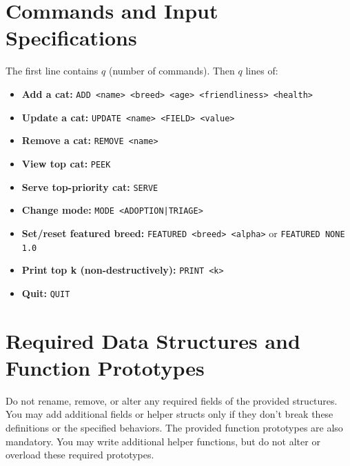 \documentclass[11pt]{article}
\begin{document}
\section*{Commands and Input Specifications}
The first line contains $q$ (number of commands). Then $q$ lines of:
\begin{itemize}
    \item \textbf{Add a cat:} \texttt{ADD <name> <breed> <age> <friendliness> <health>}
    \item \textbf{Update a cat:} \texttt{UPDATE <name> <FIELD> <value>}
    \item \textbf{Remove a cat:} \texttt{REMOVE <name>}
    \item \textbf{View top cat:} \texttt{PEEK}
    \item \textbf{Serve top-priority cat:} \texttt{SERVE}
    \item \textbf{Change mode:} \texttt{MODE <ADOPTION|TRIAGE>}
    \item \textbf{Set/reset featured breed:} \texttt{FEATURED <breed> <alpha>} or \texttt{FEATURED NONE 1.0}
    \item \textbf{Print top k (non-destructively):} \texttt{PRINT <k>}
    \item \textbf{Quit:} \texttt{QUIT}
\end{itemize}

\section*{Required Data Structures and Function Prototypes}
Do not rename, remove, or alter any required fields of the provided structures. You may add additional fields or helper structs only if they don't break these definitions or the specified behaviors. The provided function prototypes are also mandatory. You may write additional helper functions, but do not alter or overload these required prototypes.
\end{document}
